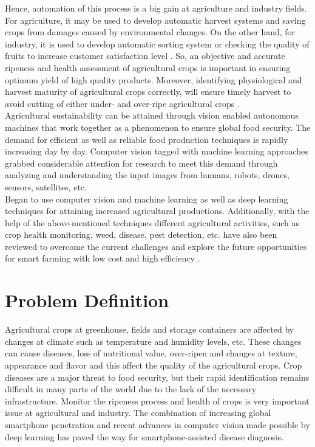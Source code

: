 Hence, automation of this process is a big gain at agriculture and industry fields. 
For agriculture, it may be used to develop automatic harvest systems and saving crops 
from damages caused by environmental changes. On the other hand, for industry, it is 
used to develop automatic sorting system or checking the quality of fruits to increase 
customer satisfaction level \cite{bre00}. So, an objective and accurate ripeness and health 
assessment of agricultural crops is important in ensuring optimum yield of high quality 
products. Moreover, identifying physiological and harvest maturity of agricultural crops 
correctly, will ensure timely harvest to avoid cutting of either under- and over-ripe 
agricultural crops \cite{may11, mah21}. \\

Agricultural sustainability can be attained through vision enabled autonomous machines 
that work together as a phenomenon to ensure global food security. The demand for 
efficient as well as reliable food production techniques is rapidly increasing day by 
day. Computer vision tagged with machine learning approaches grabbed considerable 
attention for research to meet this demand through analyzing and understanding the 
input images from humans, robots, drones, sensors, satellites, etc. \\
Began to use computer vision and machine learning as well as deep learning techniques 
for attaining increased agricultural productions. Additionally, with the help of the 
above-mentioned techniques different agricultural activities, such as crop health 
monitoring, weed, disease, pest detection, etc. have also been reviewed to overcome 
the current challenges and explore the future opportunities for smart farming with 
low cost and high efficiency \cite{dir19}.


\section{Problem Definition}

Agricultural crops at greenhouse, fields and storage containers are affected by 
changes at climate such as temperature and humidity levels, etc. These changes can 
cause diseases, loss of nutritional value, over-ripen and changes at texture, 
appearance and flavor and this affect the quality of the agricultural crops. 
Crop diseases are a major threat to food security, but their rapid identification 
remains difficult in many parts of the world due to the lack of the necessary 
infrastructure. Monitor the ripeness process and health of crops is very important 
issue at agricultural and industry. The combination of increasing global smartphone 
penetration and recent advances in computer vision made possible by deep learning 
has paved the way for smartphone-assisted disease diagnosis.


